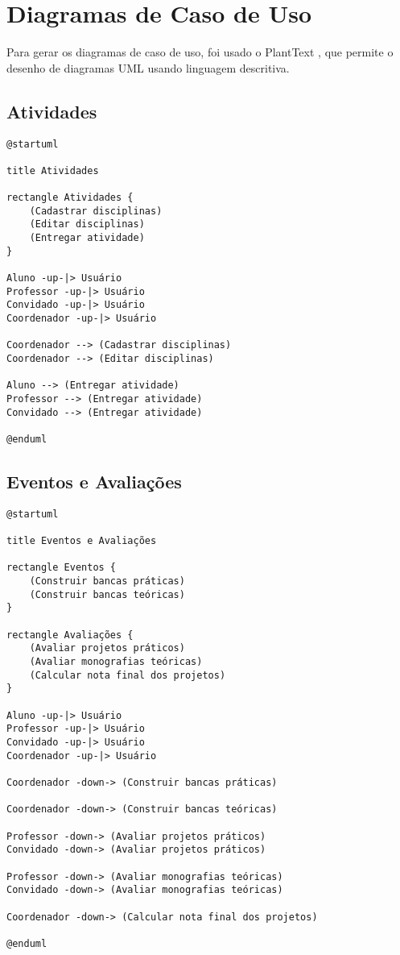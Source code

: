 \section{Diagramas de Caso de Uso}
Para gerar os diagramas de caso de uso, foi usado o PlantText \cite{planttext2018}, que permite o desenho de diagramas UML usando linguagem descritiva.

\subsection{Atividades}
\begin{lstlisting}[caption=Descrição do Diagrama de Casos de Uso da parte de Atividades, label=atv-use-case-diagram]
@startuml

title Atividades

rectangle Atividades {
    (Cadastrar disciplinas)
    (Editar disciplinas)
    (Entregar atividade)
}

Aluno -up-|> Usuário
Professor -up-|> Usuário
Convidado -up-|> Usuário
Coordenador -up-|> Usuário

Coordenador --> (Cadastrar disciplinas)
Coordenador --> (Editar disciplinas)

Aluno --> (Entregar atividade)
Professor --> (Entregar atividade)
Convidado --> (Entregar atividade)

@enduml
\end{lstlisting}

\subsection{Eventos e Avaliações}
\begin{lstlisting}[caption=Descrição do Diagrama de Casos de Uso da parte de Eventos e Avaliações, label=ev-ava-use-case-diagram]
@startuml

title Eventos e Avaliações

rectangle Eventos {
    (Construir bancas práticas)
    (Construir bancas teóricas)
}

rectangle Avaliações {
    (Avaliar projetos práticos)
    (Avaliar monografias teóricas)
    (Calcular nota final dos projetos)
}

Aluno -up-|> Usuário
Professor -up-|> Usuário
Convidado -up-|> Usuário
Coordenador -up-|> Usuário

Coordenador -down-> (Construir bancas práticas)

Coordenador -down-> (Construir bancas teóricas)

Professor -down-> (Avaliar projetos práticos)
Convidado -down-> (Avaliar projetos práticos)

Professor -down-> (Avaliar monografias teóricas)
Convidado -down-> (Avaliar monografias teóricas)

Coordenador -down-> (Calcular nota final dos projetos)

@enduml
\end{lstlisting}

